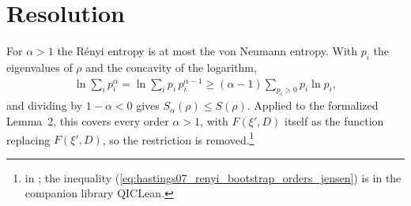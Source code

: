 \documentclass{article}
\begin{document}
\section{Resolution}
For $\alpha>1$ the Rényi entropy is at most the von Neumann entropy. With $p_i$
the eigenvalues of $\rho$ and the concavity of the logarithm,
\begin{align}
 \ln\sum_ip_i^\alpha=\ln\sum_ip_i\,p_i^{\alpha-1}
 \ge(\alpha-1)\sum_{p_i>0}p_i\ln p_i,
 \label{eq:hastings07_renyi_bootstrap_orders_jensen}
\end{align}
and dividing by $1-\alpha<0$ gives $S_\alpha(\rho)\le S(\rho)$. Applied to the
formalized Lemma~2, this covers every order $\alpha>1$, with $F(\xi',D)$ itself
as the function replacing $F(\xi',D)$, so the restriction is removed.\footnote{%
    in ; the inequality
    (\ref{eq:hastings07_renyi_bootstrap_orders_jensen}) is
     in the
    companion library QICLean.}


\end{document}
